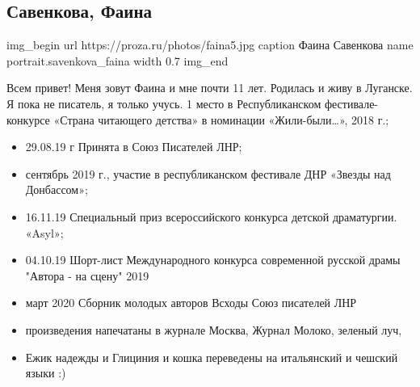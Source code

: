  
 
 

\subsection{Савенкова, Фаина}
\label{sec:poetry.rus.savenkova_faina}

\ifcmt
img_begin 
	url https://proza.ru/photos/faina5.jpg
	caption Фаина Савенкова
	name portrait.savenkova_faina
	width 0.7
img_end
\fi

Всем привет! Меня зовут Фаина и мне почти 11 лет. Родилась и живу в Луганске. Я
пока не писатель, я только учусь. 1 место в Республиканском фестивале-конкурсе
«Страна читающего детства» в номинации «Жили-были…», 2018 г.;

\begin{itemize}
  \item 29.08.19 г Принята в Союз Писателей ЛНР;
  \item сентябрь 2019 г., участие в республиканском фестивале ДНР «Звезды над Донбассом»;
  \item 16.11.19 Специальный приз всероссийского конкурса детской драматургии.  «Asyl»;
  \item 04.10.19 Шорт-лист Международного конкурса современной русской драмы "Автора - на сцену" 2019
  \item март 2020 Сборник молодых авторов Всходы Союз писателей ЛНР
  \item произведения напечатаны в журнале Москва, Журнал Молоко, зеленый луч,
  \item Ежик надежды и Глициния и кошка переведены на итальянский и чешский языки :)
\end{itemize}



